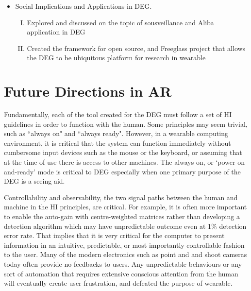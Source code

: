 \begin{itemize}
\item Social Implications and Applications in DEG. 
\begin{enumerate}[(I)]
\item Explored and discussed on the topic of sousveillance and Aliba application in DEG 
\item Created the framework for open source, and Freeglass project that allows the DEG to be ubiquitous platform for research in wearable  
\end{enumerate}

\end{itemize}

\section{Future Directions in AR}



Fundamentally, each of the tool created for the DEG must follow a set of HI guidelines in order to function with the human. Some principles may seem trivial, such as ``always on" and ``always ready". However, in a wearable computing environment, it is critical that the system can function immediately without cumbersome input devices such as the mouse or the keyboard, or assuming that at the time of use there is access to other machines. The always on, or `power-on-and-ready' mode is critical to DEG especially when one primary purpose of the DEG is a seeing aid. 

Controllability and observability, the two signal paths between the human and machine in the HI principles, are critical. For example, it is often more important to enable the auto-gain with centre-weighted matrices rather than developing a detection algorithm which may have unpredictable outcome even at 1\% detection error rate. That implies that it is very critical for the computer to present information in an intuitive, predictable, or most importantly controllable fashion to the user. Many of the modern electronics such as point and and shoot cameras today often provide no feedbacks to users. Any unpredictable behaviours or any sort of automation that requires extensive conscious attention from the human will eventually create user frustration, and defeated the purpose of wearable.

